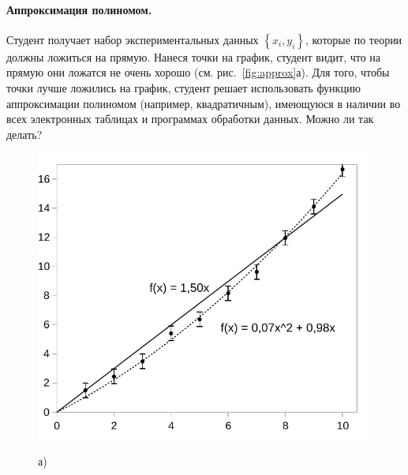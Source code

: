 \documentclass[10pt]{article}
\begin{document}
\paragraph{Аппроксимация полиномом.}

Студент получает набор экспериментальных данных $\left\{ x_{i},y_{i}\right\} $,
которые по теории должны ложиться на прямую. Нанеся точки на график,
студент видит, что на прямую они ложатся не очень хорошо (см. рис.~\ref{fig:approx}а).
Для того, чтобы точки лучше ложились на график, студент решает использовать
функцию аппроксимации полиномом (например, квадратичным), имеющуюся
в наличии во всех электронных таблицах и программах обработки данных.
Можно ли так делать?

\begin{figure}[h]
\begin{minipage}[t]{0.49\columnwidth}%
\begin{center}
\includegraphics[width=1\linewidth]{images/x2.pdf}
\par\end{center}
\begin{center}
а)
\par\end{center}%
\end{minipage}%
\begin{minipage}[t]{0.49\columnwidth}%
\begin{center}

\end{center}
\end{minipage}
\end{figure}
\end{document}
